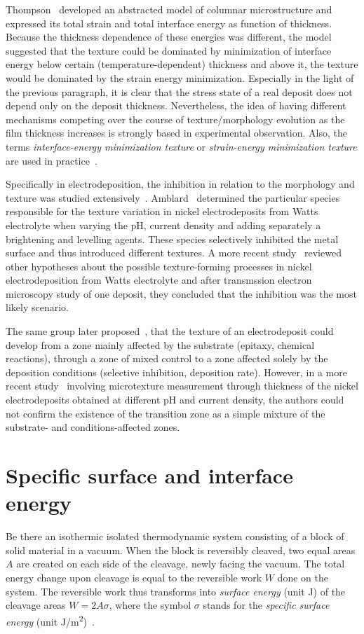 Thompson~\cite{Thompson1993} developed an abstracted model of columnar microstructure and expressed its total strain and total interface energy as function of thickness. Because the thickness dependence of these energies was different, the model suggested that the texture could be dominated by minimization of interface energy below certain (temperature-dependent) thickness and above it, the texture would be dominated by the strain energy minimization. Especially in the light of the previous paragraph, it is clear that the stress state of a real deposit does not depend only on the deposit thickness. Nevertheless, the idea of having different mechanisms competing over the course of texture/morphology evolution as the film thickness increases is strongly based in experimental observation. Also, the terms \textit{interface-energy minimization texture} or \textit{strain-energy minimization texture} are used in practice~\cite{Alimadadi2016}.

Specifically in electrodeposition, the inhibition in relation to the morphology and texture was studied extensively~\cite{Winand1992}. Amblard~\cite{Amblard1979} determined the particular species responsible for the texture variation in nickel electrodeposits from Watts electrolyte when varying the pH, current density and adding separately a brightening and levelling agents. These species selectively inhibited the metal surface and thus introduced different textures. A more recent study~\cite{BergenstofNielsen1997} reviewed other hypotheses about the possible texture-forming processes in nickel electrodeposition from Watts electrolyte and after transmssion electron microscopy study of one deposit, they concluded that the inhibition was the most likely scenario. 

The same group later proposed~\cite{Rasmussen2001}, that the texture of an electrodeposit could develop from a zone mainly affected by the substrate (epitaxy, chemical reactions), through a zone of mixed control to a zone affected solely by the deposition conditions (selective inhibition, deposition rate). However, in a more recent study~\cite{Alimadadi2016} involving microtexture measurement through thickness of the nickel electrodeposits obtained at different pH and current density, the authors could not confirm the existence of the transition zone as a simple mixture of the substrate- and conditions-affected zones. 

\section{Specific surface and interface energy}
Be there an isothermic isolated thermodynamic system consisting of a block of solid material in a vacuum. When the block is reversibly cleaved, two equal areas $A$ are created on each side of the cleavage, newly facing the vacuum. The total energy change upon cleavage is equal to the reversible work $W$ done on the system. The reversible work thus transforms into \textit{surface energy} (unit \unit{J}) of the cleavage areas $W=2A\sigma$, where the symbol $\sigma$ stands for the \textit{specific surface energy} (unit \unit{J/m^2})~\cite{Milchev2002}. 


